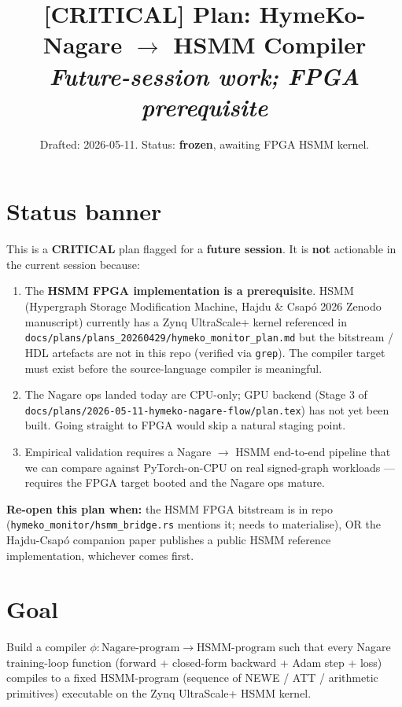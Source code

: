 \documentclass[11pt]{article}
\title{\textcolor{critical}{\textbf{[CRITICAL]}} Plan:
  HymeKo-Nagare $\to$ HSMM Compiler\\
  \emph{Future-session work; FPGA prerequisite}}
\author{}
\date{Drafted: 2026-05-11. Status: \textbf{frozen}, awaiting FPGA HSMM kernel.}
\begin{document}
\maketitle

\section*{\textcolor{critical}{Status banner}}

This is a \textbf{CRITICAL} plan flagged for a \textbf{future session}.
It is \textbf{not} actionable in the current session because:

\begin{enumerate}
  \item The \textbf{HSMM FPGA implementation is a prerequisite}.
    HSMM (Hypergraph Storage Modification Machine, Hajdu \& Csapó 2026
    Zenodo manuscript) currently has a Zynq UltraScale+ kernel
    referenced in \texttt{docs/plans/plans\_20260429/hymeko\_monitor\_plan.md}
    but the bitstream / HDL artefacts are not in this repo
    (verified via \texttt{grep}). The compiler target must exist
    before the source-language compiler is meaningful.
  \item The Nagare ops landed today are CPU-only; GPU backend
    (Stage 3 of \texttt{docs/plans/2026-05-11-hymeko-nagare-flow/plan.tex})
    has not yet been built. Going straight to FPGA would skip a
    natural staging point.
  \item Empirical validation requires a Nagare $\to$ HSMM
    end-to-end pipeline that we can compare against PyTorch-on-CPU
    on real signed-graph workloads --- requires the FPGA target
    booted and the Nagare ops mature.
\end{enumerate}

\textbf{Re-open this plan when:} the HSMM FPGA bitstream is in repo
(\texttt{hymeko\_monitor/hsmm\_bridge.rs} mentions it; needs to
materialise), OR the Hajdu-Csapó companion paper publishes a public
HSMM reference implementation, whichever comes first.

\section{Goal}

Build a compiler $\phi : \text{Nagare-program} \to \text{HSMM-program}$
such that every Nagare training-loop function (forward + closed-form
backward + Adam step + loss) compiles to a fixed HSMM-program
(sequence of NEWE / ATT / arithmetic primitives) executable on the
Zynq UltraScale+ HSMM kernel.
\end{document}
